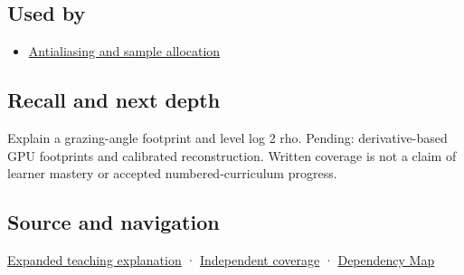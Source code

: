 \subsection{Used by}\label{appendix-b677a85ba76f-used-by}

\hypertarget{appendix-b677a85ba76f-used-by}{}

\begin{itemize}
\tightlist
\item
  \hyperref[appendix-4192b2bdd21e]{Antialiasing and sample allocation}
\end{itemize}

\subsection{Recall and next depth}\label{appendix-b677a85ba76f-recall-and-next-depth}

\hypertarget{appendix-b677a85ba76f-recall-and-next-depth}{}

Explain a grazing-angle footprint and level log 2 rho. Pending: derivative-based GPU footprints and calibrated reconstruction. Written coverage is not a claim of learner mastery or accepted numbered-curriculum progress.

\subsection{Source and navigation}\label{appendix-b677a85ba76f-source-and-navigation}

\hypertarget{appendix-b677a85ba76f-source-and-navigation}{}

\hyperref[04-visual-computing-ii-ch042-multiresolution-work-must-preserve-the-right-information]{Expanded teaching explanation} · \hyperref[appendix-fd090d982a15-xr01---independent-seeing-and-representation-source]{Independent coverage} · \hyperref[appendix-4ad47bdd269a]{Dependency Map}
